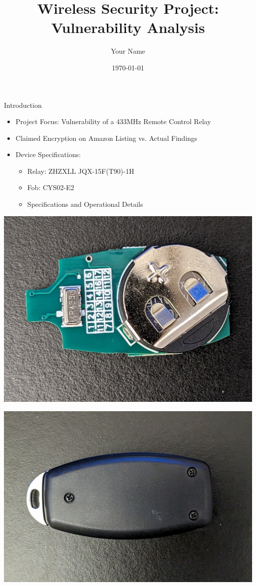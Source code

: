 \documentclass{beamer}
\title{Wireless Security Project: Vulnerability Analysis}
\author{Your Name}
\date{\today}
\begin{document}
\frame{\titlepage}

\begin{frame}{Introduction}
    \begin{itemize}
        \item Project Focus: Vulnerability of a 433MHz Remote Control Relay
        \item Claimed Encryption on Amazon Listing vs. Actual Findings
        \item Device Specifications:
            \begin{itemize}
                \item Relay: ZHZXLL JQX-15F(T90)-1H
                \item Fob: CYS02-E2
                \item Specifications and Operational Details
            \end{itemize}
    \end{itemize}
\end{frame}

\begin{frame}
\includegraphics[width=\textwidth]{../Pics/device/fob_back_bare.jpg}
\end{frame}

\begin{frame}
\includegraphics[width=\textwidth]{../Pics/device/fob_back_case.jpg}
\end{frame}
\end{document}
